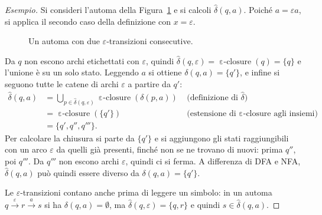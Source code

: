 \documentclass[a4paper, 11pt, oneside]{book}
\theoremstyle{formale}
\DeclareMathOperator{\eclosure}{\varepsilon\text{-}closure}
\newenvironment{esempio}
    {\begin{proof}[\textit{Esempio}]\renewcommand{\qedsymbol}{$\diamond$}}
    {\end{proof}}
\begin{document}
    \begin{esempio}
        Si consideri l'automa della Figura~\ref{fig:enfa-esempio} e si calcoli
        $\hat{\delta}(q, a)$. Poich\'e $a = \varepsilon a$, si applica il secondo caso
        della definizione con $x = \varepsilon$.

        \begin{figure}[H]
            \centering
            \caption{Un automa con due $\varepsilon$-transizioni consecutive.}
            \label{fig:enfa-esempio}
        \end{figure}

        Da $q$ non escono archi etichettati con $\varepsilon$, quindi
        $\hat{\delta}(q, \varepsilon) = \eclosure(q) = \{q\}$ e l'unione \`e su un solo
        stato. Leggendo $a$ si ottiene $\delta(q, a) = \{q'\}$, e infine si seguono tutte
        le catene di archi $\varepsilon$ a partire da $q'$:
        \begin{align*}
            \hat{\delta}(q, a)
                &= \bigcup_{p \in \hat{\delta}(q, \varepsilon)} \eclosure(\delta(p, a))
                    && \text{(definizione di $\hat{\delta}$)} \\
                &= \eclosure(\{q'\})
                    && \text{(estensione di $\eclosure$ agli insiemi)} \\
                &= \{q', q'', q'''\}.
        \end{align*}
        Per calcolare la chiusura si parte da $\{q'\}$ e si aggiungono gli stati
        raggiungibili con un arco $\varepsilon$ da quelli gi\`a presenti, finch\'e non se
        ne trovano di nuovi: prima $q''$, poi $q'''$. Da $q'''$ non escono archi
        $\varepsilon$, quindi ci si ferma. A differenza di DFA e NFA, $\hat{\delta}(q, a)$
        pu\`o quindi essere diverso da $\delta(q, a) = \{q'\}$.

        Le $\varepsilon$-transizioni contano anche prima di leggere un simbolo: in un
        automa $q \xrightarrow{\varepsilon} r \xrightarrow{a} s$ si ha
        $\delta(q, a) = \emptyset$, ma $\hat{\delta}(q, \varepsilon) = \{q, r\}$ e quindi
        $s \in \hat{\delta}(q, a)$.
    \end{esempio}
\end{document}

